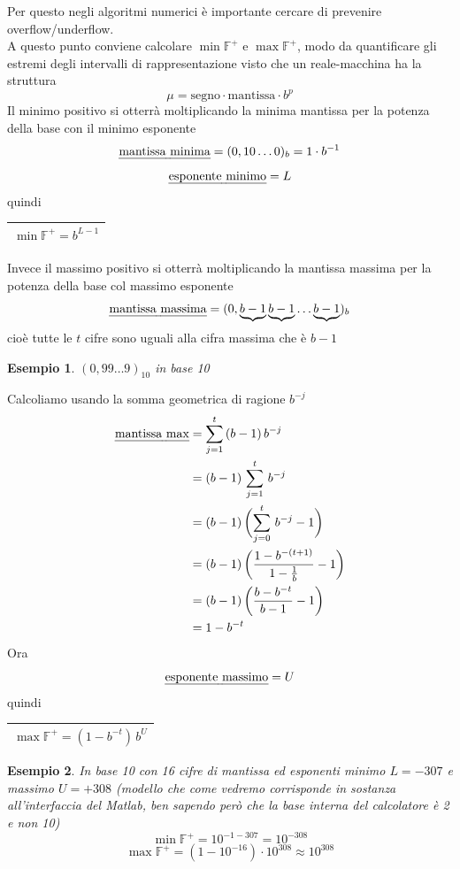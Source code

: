 \documentclass[12pt]{article}
\newtheorem*{esempio}{Esempio}
\begin{document}
Per questo negli algoritmi numerici è importante cercare di prevenire overflow/underflow. \\
A questo punto conviene calcolare $\min \mathbb{F}^+$ e $\max \mathbb{F}^+$, modo da quantificare gli estremi degli intervalli di rappresentazione visto che un reale-macchina ha la struttura 
\[\mu = \text{segno} \cdot \text{mantissa} \cdot b^p\]
Il minimo positivo si otterrà moltiplicando la minima mantissa per la potenza della base con il minimo esponente
\[ \text{\uline{mantissa minima}} = (0,10 \dotsc 0)_b = 1 \cdot b^{-1}\]
\[ \text{\uline{esponente minimo}} = L\]
quindi
\begin{table}[h!]
    \centering
    \begin{tabular}{|c|}
    \hline
        $\min \mathbb{F}^+ = b^{L-1}$ \\
    \hline
    \end{tabular}
\end{table}
Invece il massimo positivo si otterrà moltiplicando la mantissa massima per la potenza della base col massimo esponente
\[ \text{\uline{mantissa massima}} = (0,\underbrace{b-1} \underbrace{b-1} \dotsc \underbrace{b-1})_b\]
cioè tutte le $t$ cifre sono uguali alla cifra massima che è $b-1$
\begin{esempio}
$(0,99 \dotsc 9)_{10}$ in base 10
\end{esempio}
Calcoliamo usando la somma geometrica di ragione $b^{-j}$
\[\begin{split}
    \text{\uline{mantissa max}} & = \sum_{j=1}^t\,(b-1)\,b^{-j} \\
    & = (b-1)\,\sum_{j=1}^t\,b^{-j} \\
    & = (b-1)\,\biggl(\sum_{j=0}^t\,b^{-j} - 1\biggr) \\
    & = (b-1)\,\biggl(\frac{1 - b^{-(t+1)}}{1 - \frac{1}{b}} - 1\biggr) \\
    & = (b-1)\,\biggl(\frac{b - b^{-t}}{b - 1} - 1\biggr) \\
    & = 1 - b^{-t} \\
\end{split}\]
Ora \[ \text{\uline{esponente massimo}} = U\] quindi
\begin{table}[h!]
    \centering
    \begin{tabular}{|c|}
    \hline
        $\max \mathbb{F}^+ = (1 - b^{-t})\,b^U$ \\
    \hline
    \end{tabular}
\end{table}
\begin{esempio} 
In base 10 con 16 cifre di mantissa ed esponenti minimo $L = - 307$ e massimo $U = + 308$ (modello che come vedremo corrisponde in sostanza all'interfaccia del Matlab, ben sapendo però che la base interna del calcolatore è 2 e non 10)
\[ \min \mathbb{F}^+ = 10^{- 1 - 307} = 10^{- 308} \]
\[ \max \mathbb{F}^+ = (1 - 10^{-16})\cdot 10^{308} \approx 10^{308}\]
\end{esempio}
\end{document}
